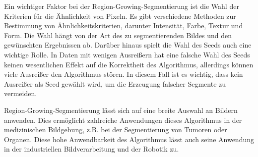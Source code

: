 Ein wichtiger Faktor bei der Region-Growing-Segmentierung ist die Wahl der Kriterien für die Ähnlichkeit von Pixeln. Es gibt verschiedene Methoden zur Bestimmung von Ähnlichkeitskriterien, darunter Intensität, Farbe, Textur und Form. Die Wahl hängt von der Art des zu segmentierenden Bildes und den gewünschten Ergebnissen ab. Darüber hinaus spielt die Wahl des Seeds auch eine wichtige Rolle. In Daten mit wenigen Ausreißern hat eine falsche Wahl des Seeds keinen wesentlichen Effekt auf die Korrektheit des Algorithmus, allerdings können viele Ausreißer den Algorithmus stören. In diesem Fall ist es wichtig, dass kein Ausreißer als Seed gewählt wird, um die Erzeugung falscher Segmente zu vermeiden. \autocite[641-643]{adams_seeded_1994}

Region-Growing-Segmentierung lässt sich auf eine breite Auswahl an Bildern anwenden. Dies ermöglicht zahlreiche Anwendungen dieses Algorithmus in der medizinischen Bildgebung, z.B. bei der Segmentierung von Tumoren oder Organen. Diese hohe Anwendbarkeit des Algorithmus lässt auch seine Anwendung in der industriellen Bildverarbeitung und der Robotik zu.\autocite[646]{adams_seeded_1994}